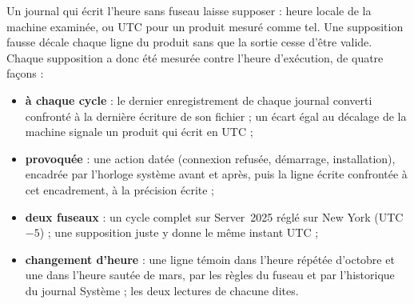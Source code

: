 \documentclass[11pt,a4paper,oneside]{report}
\begin{document}
Un journal qui écrit l'heure sans fuseau laisse \wac{} supposer : heure locale
de la machine examinée, ou UTC pour un produit mesuré comme tel. Une
supposition fausse décale chaque ligne du produit sans que la sortie cesse
d'être valide. Chaque supposition a donc été mesurée contre l'heure
d'exécution, de quatre façons :
\begin{itemize}
  \item \textbf{à chaque cycle} : le dernier enregistrement de chaque journal
    converti confronté à la dernière écriture de son fichier ; un écart égal
    au décalage de la machine signale un produit qui écrit en UTC ;
  \item \textbf{provoquée} : une action datée (connexion refusée, démarrage,
    installation), encadrée par l'horloge système avant et après, puis la
    ligne écrite confrontée à cet encadrement, à la précision écrite ;
  \item \textbf{deux fuseaux} : un cycle complet sur Server~2025 réglé sur
    New York (UTC$-5$) ; une supposition juste y donne le même instant UTC ;
  \item \textbf{changement d'heure} : une ligne témoin dans l'heure répétée
    d'octobre et une dans l'heure sautée de mars, par les règles du fuseau et
    par l'historique du journal Système ; les deux lectures de chacune dites.
\end{itemize}
\end{document}
